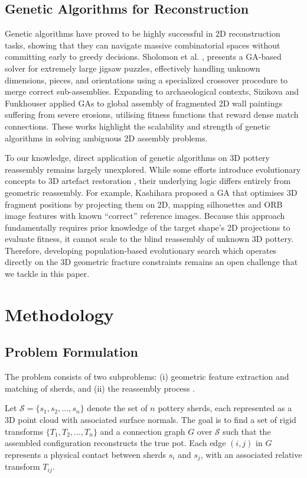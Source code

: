 \documentclass[conference]{IEEEtran}
\begin{document}
\subsection{Genetic Algorithms for Reconstruction}
Genetic algorithms have proved to be highly successful in 2D reconstruction tasks, showing that they can navigate massive combinatorial spaces without committing early to greedy decisions. Sholomon et al. \cite{b10}, \cite{b11} presents a GA-based solver for extremely large jigsaw puzzles, effectively handling unknown dimensions, pieces, and orientations using a specialized crossover procedure to merge correct sub-assemblies. Expanding to archaeological contexts, Sizikova and Funkhouser \cite{b12} applied GAs to global assembly of fragmented 2D wall paintings suffering from severe erosions, utilising fitness functions that reward dense match connections. These works highlight the scalability and strength of genetic algorithms in solving ambiguous 2D assembly problems.

To our knowledge, direct application of genetic algorithms on 3D pottery reassembly remains largely unexplored. While some efforts introduce evolutionary concepts to 3D artefact restoration \cite{b17}, their underlying logic differs entirely from geometric reassembly. For example, Kashihara \cite{b17} proposed a GA that optimises 3D fragment positions by projecting them on 2D, mapping silhouettes and ORB image features with known ``correct'' reference images. Because this approach fundamentally requires prior knowledge of the target shape's 2D projections to evaluate fitness, it cannot scale to the blind reassembly of unknown 3D pottery. Therefore, developing population-based evolutionary search which operates directly on the 3D geometric fracture constraints remains an open challenge that we tackle in this paper.

\section{Methodology}
\subsection{Problem Formulation}
The problem consists of two subproblems: (i) geometric feature extraction and matching of sherds, and (ii) the reassembly process \cite{b1}.

Let $\mathcal{S} = \{s_1, s_2, \ldots, s_n\}$ denote the set of $n$ pottery sherds, each represented as a 3D point cloud with associated surface normals. The goal is to find a set of rigid transforms $\{T_1, T_2, \ldots, T_n\}$ and a connection graph $G$ over $\mathcal{S}$ such that the assembled configuration reconstructs the true pot. Each edge $(i, j)$ in $G$ represents a physical contact between sherds $s_i$ and $s_j$, with an associated relative transform $T_{ij}$.
\end{document}
